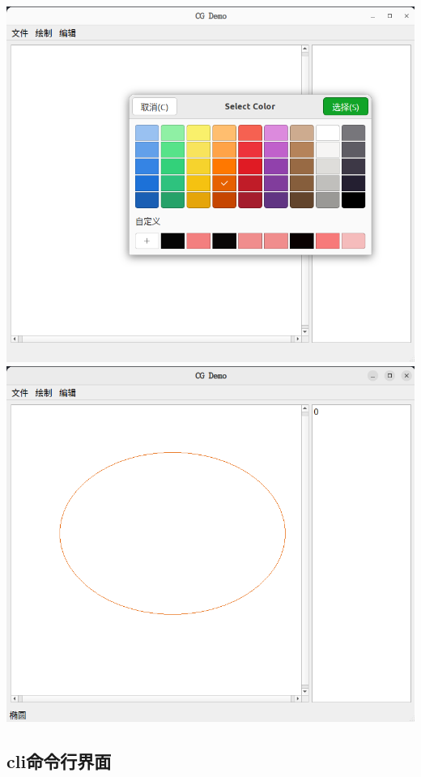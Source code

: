 \documentclass[a4paper,UTF8]{article}
\theoremstyle{definition}
\begin{document}
\begin{center}
	\includegraphics[width=6in]{报告/color1.png}
	\includegraphics[width=6in]{报告/color2.png}
\end{center}

\subsection{cli命令行界面}
\end{document}
